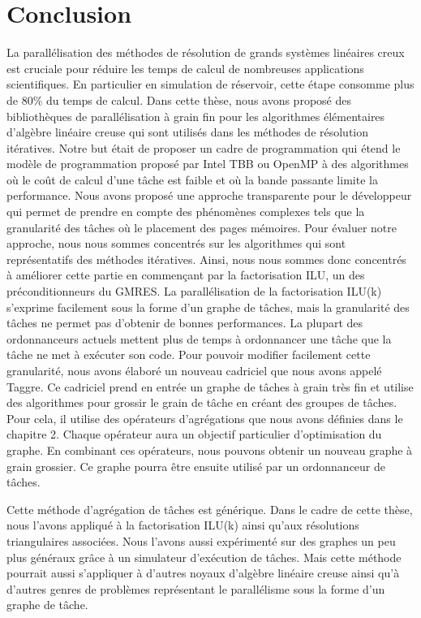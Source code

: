 \section{Conclusion}
%
%
La parallélisation des méthodes de résolution de grands systèmes linéaires creux est cruciale pour réduire les temps de calcul de nombreuses applications scientifiques.
%
En particulier en simulation de réservoir, cette étape consomme plus de 80\% du temps de calcul.
%
Dans cette thèse, nous avons proposé des bibliothèques de parallélisation à grain fin pour les algorithmes élémentaires d'algèbre linéaire creuse qui sont utilisés dans les méthodes de résolution itératives.
%
Notre but était de proposer un cadre de programmation qui étend le modèle de programmation proposé par Intel TBB ou OpenMP à des algorithmes où le coût de calcul d'une tâche est faible et où la bande passante limite la performance.
%
Nous avons proposé une approche transparente pour le développeur qui permet de prendre en compte des phénomènes complexes tels que la granularité des tâches où le placement des pages mémoires.
%
Pour évaluer notre approche, nous nous sommes concentrés sur les algorithmes qui sont représentatifs des méthodes itératives.
%
Ainsi, nous nous sommes donc concentrés à améliorer cette partie en commençant par la factorisation ILU, un des préconditionneurs du GMRES.
%
La parallélisation de la factorisation ILU(k) s'exprime facilement sous la forme d'un graphe de tâches, mais la granularité des tâches ne permet pas d'obtenir de bonnes performances.
%
La plupart des ordonnanceurs actuels mettent plus de temps à ordonnancer une tâche que la tâche ne met à exécuter son code.
%
Pour pouvoir modifier facilement cette granularité, nous avons élaboré un nouveau cadriciel que nous avons appelé Taggre.
%
Ce cadriciel prend en entrée un graphe de tâches à grain très fin et utilise des algorithmes pour grossir le grain de tâche en créant des groupes de tâches.
%
Pour cela, il utilise des opérateurs d'agrégations que nous avons définies dans le chapitre 2.
%
Chaque opérateur aura un objectif particulier d'optimisation du graphe.
%
En combinant ces opérateurs, nous pouvons obtenir un nouveau graphe à grain grossier.
%
Ce graphe pourra être ensuite utilisé par un ordonnanceur de tâches.


Cette méthode d'agrégation de tâches est générique.
%
Dans le cadre de cette thèse, nous l'avons appliqué à la factorisation ILU(k) ainsi qu'aux résolutions triangulaires associées.
%
Nous l'avons aussi expérimenté sur des graphes un peu plus généraux grâce à un simulateur d'exécution de tâches.
%
Mais cette méthode pourrait aussi s'appliquer à d'autres noyaux d'algèbre linéaire creuse ainsi qu'à d'autres genres de problèmes représentant le parallélisme sous la forme d'un graphe de tâche.



